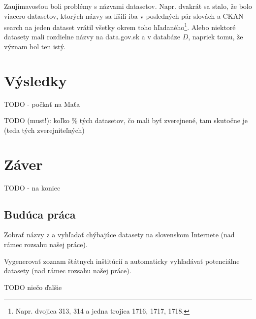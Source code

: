 \documentclass[12pt,a4paper]{article}
\begin{document}

Zaujímavosťou boli problémy s názvami datasetov. Napr. dvakrát sa stalo, že bolo viacero datasetov, ktorých názvy sa líšili iba v posledných pár slovách a CKAN search na jeden dataset vrátil všetky okrem toho hľadaného\footnote{
Napr. dvojica 313, 314 a jedna trojica 1716, 1717, 1718.
}. Alebo niektoré datasety mali rozdielne názvy na data.gov.sk a v databáze $D$, napriek tomu, že význam bol ten istý. 

\section{Výsledky}

TODO - počkať na Maťa 


TODO (must!): koľko \% tých datasetov, čo mali byť zverejnené, tam skutočne je (teda tých zverejniteľných)


\section{Záver} 

TODO - na koniec 

\subsection{Budúca práca} 
\label{future-work}

Zobrať názvy z \cite{525} a vyhľadať chýbajúce datasety na slovenskom Internete (nad rámec rozsahu našej práce). 

Vygenerovať zoznam štátnych inštitúcií a automaticky vyhľadávať potenciálne datasety (nad rámec rozsahu našej práce).

TODO niečo ďalšie 
\end{document}
